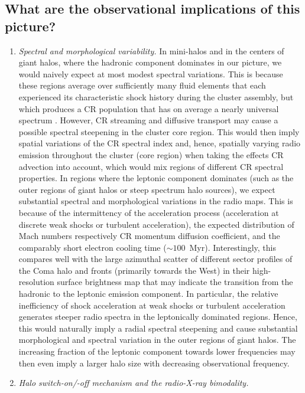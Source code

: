 \documentclass[useAMS,usenatbib]{mn2e}
\begin{document}
\subsection{What are the observational implications of this picture?}

\begin{enumerate}
\item {\em Spectral and morphological variability.} In mini-halos and in the
  centers of giant halos, where the hadronic component dominates in our picture,
  we would naively expect at most modest spectral variations. This is because
  these regions average over sufficiently many fluid elements that each
  experienced its characteristic shock history during the cluster assembly, but
  which produces a CR population that has on average a nearly universal spectrum
  \citep{2010MNRAS.409..449P}. However, CR streaming and diffusive transport may
  cause a possible spectral steepening in the cluster core region. This would
  then imply spatial variations of the CR spectral index and, hence, spatially
  varying radio emission throughout the cluster (core region) when taking the
  effects CR advection into account, which would mix regions of different CR
  spectral properties. In regions where the leptonic component dominates (such
  as the outer regions of giant halos or steep spectrum halo sources), we expect
  substantial spectral and morphological variations in the radio maps. This is
  because of the intermittency of the acceleration process (acceleration at
  discrete weak shocks or turbulent acceleration), the expected distribution of
  Mach numbers respectively CR momentum diffusion coefficient, and the
  comparably short electron cooling time ($\sim100$~Myr). Interestingly, this
  compares well with the large azimuthal scatter of different sector profiles of
  the Coma halo \citep[Fig.~4 of][]{2011MNRAS.412....2B} and fronts (primarily
  towards the West) in their high-resolution surface brightness map that may
  indicate the transition from the hadronic to the leptonic emission
  component. In particular, the relative inefficiency of shock acceleration at
  weak shocks or turbulent acceleration generates steeper radio spectra in
  the leptonically dominated regions. Hence, this would naturally imply a radial
  spectral steepening and cause substantial morphological and spectral variation
  in the outer regions of giant halos. The increasing fraction of the leptonic
  component towards lower frequencies may then even imply a larger halo size
  with decreasing observational frequency.
\item {\em Halo switch-on/-off mechanism and the radio-X-ray bimodality.}

\end{enumerate}
\end{document}
